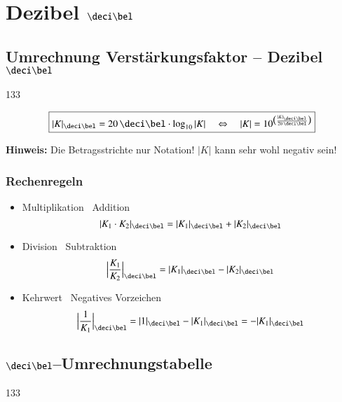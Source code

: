 \section[Dezibel \deci \bel]{Dezibel $\deci \bel$}


\subsection[Umrechnung Verstärkungsfaktor -- Dezibel \deci \bel]{Umrechnung Verstärkungsfaktor -- Dezibel $\deci \bel$}{133}

$$ \boxed{ |K|_{\deci \bel} = 20 \, \deci \bel \cdot \log_{10} |K| \quad \Leftrightarrow \quad 
            |K| = 10 ^{\big( \frac{|K|_{\deci \bel}}{20 \, \deci \bel}\big)}  } $$

\textbf{Hinweis:} Die Betragsstrichte nur Notation! $|K|$ kann sehr wohl negativ sein!


\subsubsection{Rechenregeln}

\begin{itemize}
    \item Multiplikation \textrightarrow\ Addition 
        \vspace{-0.2cm}
        $$ | K_1 \cdot K_2 |_{\deci \bel} = | K_1 |_{\deci \bel} + | K_2 |_{\deci \bel} $$
    \item Division \textrightarrow\ Subtraktion 
        $$ \Big| \frac{K_1}{K_2} \Big|_{\deci \bel} = | K_1 |_{\deci \bel} - | K_2 |_{\deci \bel} $$
    \item Kehrwert \textrightarrow\ Negatives Vorzeichen 
        $$ \Big| \frac{1}{K_1} \Big|_{\deci \bel} = | 1 |_{\deci \bel} - | K_1 |_{\deci \bel} = - | K_1 |_{\deci \bel} $$
\end{itemize}


\subsection[\deci \bel--Umrechnungstabelle]{$\deci \bel$--Umrechnungstabelle}{133}

